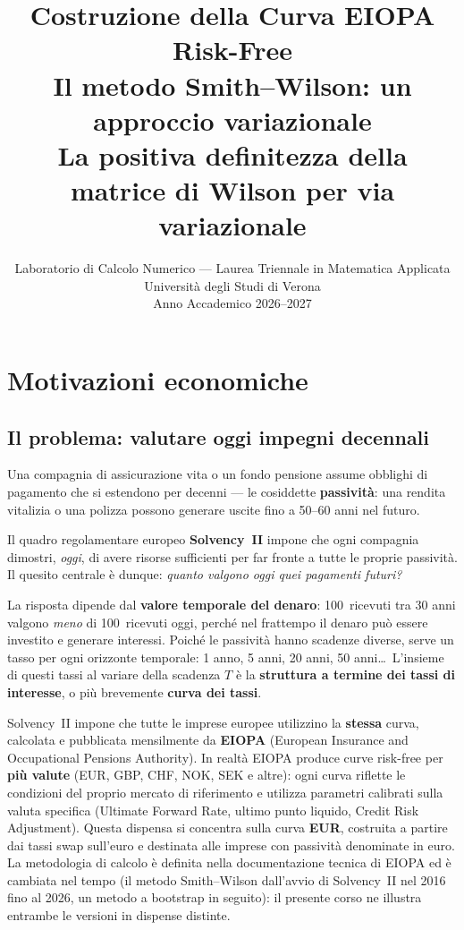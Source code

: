 \documentclass[11pt,a4paper]{article}
\title{%
  \textbf{Costruzione della Curva EIOPA Risk-Free}\\[6pt]
  \large Il metodo Smith--Wilson: un approccio variazionale\\[4pt]
  \normalsize La positiva definitezza della matrice di Wilson per via variazionale\\[2pt]
}
\author{Laboratorio di Calcolo Numerico --- Laurea Triennale in Matematica Applicata\\
  Universit\`a degli Studi di Verona\\[2pt]
  Anno Accademico 2026--2027}
\date{}
\theoremstyle{plain}
\theoremstyle{definition}
\theoremstyle{remark}
\begin{document}
\maketitle
\tableofcontents
\newpage

\section{Motivazioni economiche}

\subsection{Il problema: valutare oggi impegni decennali}

Una compagnia di assicurazione vita o un fondo pensione assume obblighi di pagamento che si
estendono per decenni --- le cosiddette \textbf{passività}: una rendita vitalizia o una
polizza possono generare uscite fino a 50--60 anni nel futuro.

Il quadro regolamentare europeo \textbf{Solvency~II} impone che ogni compagnia dimostri,
\emph{oggi}, di avere risorse sufficienti per far fronte a tutte le proprie passività. Il
quesito centrale \`e dunque: \emph{quanto valgono oggi quei pagamenti futuri?}

La risposta dipende dal \textbf{valore temporale del denaro}: 100\,\texteuro{} ricevuti tra
30 anni valgono \emph{meno} di 100\,\texteuro{} ricevuti oggi, perch\'e nel frattempo il
denaro pu\`o essere investito e generare interessi. Poich\'e le passivit\`a hanno scadenze
diverse, serve un tasso per ogni orizzonte temporale: 1 anno, 5 anni, 20 anni, 50 anni\ldots\
L'insieme di questi tassi al variare della scadenza $T$ \`e la \textbf{struttura a termine
dei tassi di interesse}, o pi\`u brevemente \textbf{curva dei tassi}.

Solvency~II impone che tutte le imprese europee utilizzino la \textbf{stessa} curva,
calcolata e pubblicata mensilmente da \textbf{EIOPA} (European Insurance and Occupational
Pensions Authority). In realt\`a EIOPA produce curve risk-free per \textbf{pi\`u valute}
(EUR, GBP, CHF, NOK, SEK e altre): ogni curva riflette le condizioni del proprio mercato
di riferimento e utilizza parametri calibrati sulla valuta specifica (Ultimate Forward Rate,
ultimo punto liquido, Credit Risk Adjustment). Questa dispensa si concentra sulla curva
\textbf{EUR}, costruita a partire dai tassi swap sull'euro e destinata alle imprese con
passivit\`a denominate in euro. La metodologia di calcolo \`e definita nella documentazione
tecnica di EIOPA ed \`e cambiata nel tempo (il metodo Smith--Wilson dall'avvio di Solvency~II
nel 2016 fino al 2026, un metodo a bootstrap in seguito): il presente corso ne illustra
entrambe le versioni in dispense distinte.
\end{document}
